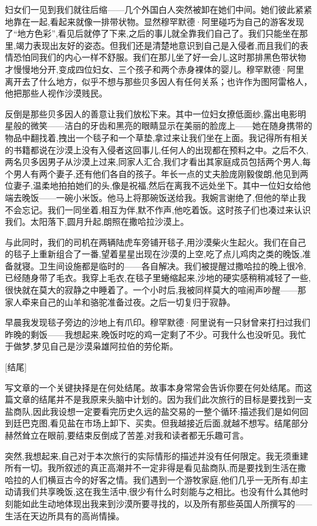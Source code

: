 妇女们一见到我们就往后缩——几个外国白人突然被卸在她们中间。她们彼此紧紧地靠在一起,看起来就像一排带状物。显然穆罕默德·阿里碰巧为自己的游客发现了“地方色彩”,看见后就停了下来,之后的事儿就全靠我们自己了。我们只能坐在那里,竭力表现出友好的姿态。但我们还是清楚地意识到自己是入侵者,而且我们的表情恐怕同我们的内心一样不舒服。我们在那儿坐了好一会儿,这时那排黑色带状物才慢慢地分开,变成四位妇女、三个孩子和两个赤身裸体的婴儿。穆罕默德·阿里离开去了什么地方，似乎不想与那些贝多因人有任何关系；也许作为图阿雷格人，他把那些人视作沙漠贱民。


反倒是那些贝多因人的善意让我们放松下来。其中一位妇女撩低面纱,露出电影明星般的微笑——洁白的牙齿和黑亮的眼睛显示在美丽的脸庞上——她在随身携带的物品中翻找着,拽出一个毯子和一个草垫,拿过来让我们坐在上面。我记得所有相关的书籍都说在沙漠上没有入侵者这回事儿,任何人的出现都在预料之中。之后不久,两名贝多因男子从沙漠上过来,同家人汇合,我们才看出其家庭成员包括两个男人,每个男人有两个妻子,还有他们各自的孩子。年长一点的丈夫脸庞刚毅俊朗,他见到两位妻子,温柔地拍拍她们的头,像是祝福,然后在离我不远处坐下。其中一位妇女给他端去晚饭——一碗小米饭。他马上将那碗饭送给我。我婉言谢绝了,但他的举止我不会忘记。我们一同坐着,相互为伴,默不作声,他吃着饭。这时孩子们也凑过来认识我们。太阳落下,圆月升起,朗照在撒哈拉沙漠上。

与此同时，我们的司机在两辆陆虎车旁铺开毯子,用沙漠柴火生起火。我们在自己的毯子上重新组合了一番,望着星星出现在沙漠的上空,吃了点儿鸡肉之类的晚饭,准备就寝。卫生间设施都是临时的——各自解决。我们被提醒过撒哈拉的晚上很冷,已经随身带了毛衣。我穿上毛衣,在毯子里蜷缩起来,沙地的硬实感稍稍减轻了一些,很快就在莫大的寂静之中睡着了。一个小时后,我被同样莫大的喧闹声吵醒——那家人牵来自己的山羊和骆驼准备过夜。之后一切复归于寂静。

早晨我发现毯子旁边的沙地上有爪印。穆罕默德·阿里说有一只豺曾来打扫过我们昨晚的剩饭——我想起来,晚饭时吃的鸡一定剩了不少。可我什么也没听见。我忙于做梦,梦见自己是沙漠枭雄阿拉伯的劳伦斯。

[结尾]

写文章的一个关键抉择是在何处结尾。故事本身常常会告诉你要在何处结尾。而这篇文章的结尾并不是我原来头脑中计划的。因为我们此次旅行的目标是要找到一支盐商队,因此我设想一定要看完历史久远的盐交易的一整个循环:描述我们是如何回到廷巴克图,看见盐在市场上卸下、买卖。但我越接近后面,就越不想写。结尾部分赫然耸立在眼前,要结束反倒成了苦差,对我和读者都无乐趣可言。

突然,我想起来,自己对于本次旅行的实际情形的描述并没有任何限定。我无须重建所有一切。我所叙述的真正高潮并不一定非得是看见盐商队,而是要找到生活在撒哈拉的人们横亘古今的好客之情。我们遇到一个游牧家庭,他们几乎一无所有,却主动请我们共享晚饭,这在我生活中,很少有什么时刻能与之相比。也没有什么其他时刻能如此生动地体现出我来到沙漠所要寻找的，以及所有那些英国人所撰写的——生活在天边所具有的高尚情操。

